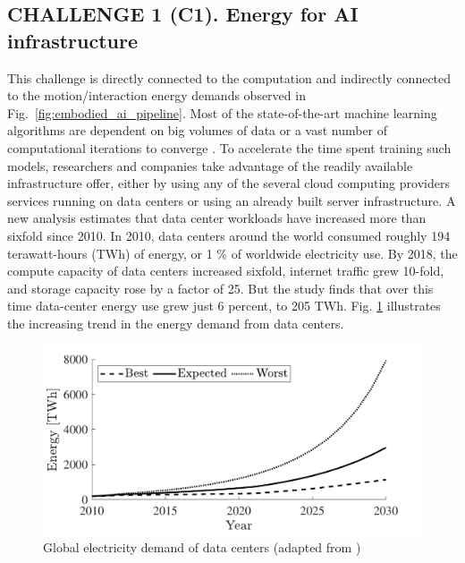 \subsection{\textbf{CHALLENGE 1} (C1). Energy for AI infrastructure}
This challenge is directly connected to the computation and indirectly connected to the motion/interaction energy demands observed in Fig.~\ref{fig:embodied_ai_pipeline}.
Most of the state-of-the-art machine learning algorithms are dependent on big volumes of data or a vast number of computational iterations to converge \cite{Strubell2019EnergyAP}. To accelerate the time spent training such models, researchers and companies take advantage of the readily available infrastructure offer, either by using any of the several cloud computing providers services running on data centers or using an already built server infrastructure. A new analysis estimates that data center workloads have increased more than sixfold since 2010. In 2010, data centers around the world consumed roughly 194 terawatt-hours (TWh) of energy, or 1 \% of worldwide electricity use. By 2018, the compute capacity of data centers increased sixfold, internet traffic grew 10-fold, and storage capacity rose by a factor of 25. But the study finds that over this time data-center energy use grew just 6 percent, to 205 TWh. Fig. \ref{fig:dataCenterEnergy} illustrates the increasing trend in the energy demand from data centers.
\begin{figure}[!t]
	\centering
	\includegraphics[width=0.9\columnwidth]{fig/data_center_energy_consumption.pdf}
	\caption{Global electricity demand of data centers (adapted from \cite{andrae2015global})}
	\label{fig:dataCenterEnergy}
\end{figure}
